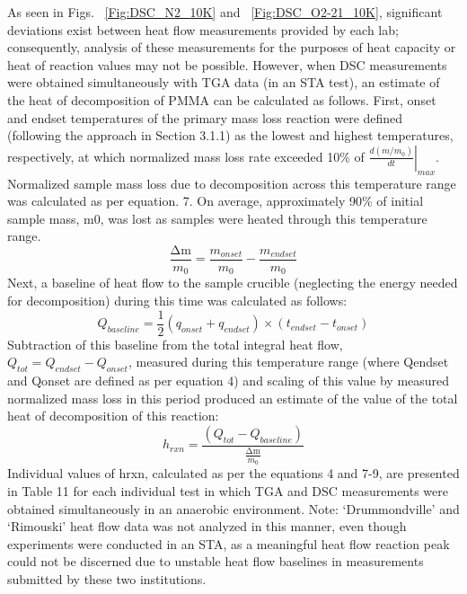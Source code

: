 \documentclass{book}
\begin{document}
As seen in Figs. ~\ref{Fig:DSC_N2_10K} and ~\ref{Fig:DSC_O2-21_10K}, significant deviations exist between heat flow measurements provided by each lab; consequently, analysis of these measurements for the purposes of heat capacity or heat of reaction values may not be possible. However, when DSC measurements were obtained simultaneously with TGA data (in an STA test), an estimate of the heat of decomposition of PMMA can be calculated as follows. First, onset and endset temperatures of the primary mass loss reaction were defined (following the approach in Section 3.1.1) as the lowest and highest temperatures, respectively, at which normalized mass loss rate exceeded 10\% of $\left.\frac{d\left(m/m_0\right)}{dt}\right|_{max}$. Normalized sample mass loss due to decomposition across this temperature range was calculated as per equation. 7. On average, approximately 90\% of initial sample mass, m0, was lost as samples were heated through this temperature range.
\begin{equation}
\frac{\mathrm{\Delta m}}{m_0}=\frac{m_{onset}}{m_0}-\frac{m_{endset}}{m_0}
\end{equation}
Next, a baseline of heat flow to the sample crucible (neglecting the energy needed for decomposition) during this time was calculated as follows:
\begin{equation}
   Q_{baseline}=\frac{1}{2}\left(q_{onset}+q_{endset}\right)\times\left(t_{endset}-t_{onset}\right)
\end{equation}
Subtraction of this baseline from the total integral heat flow, $Q_{tot}=Q_{endset}-Q_{onset}$, measured during this temperature range (where Qendset and Qonset are defined as per equation 4) and scaling of this value by measured normalized mass loss in this period produced an estimate of the value of the total heat of decomposition of this reaction:
\begin{equation}
h_{rxn}=\frac{\left(Q_{tot}-Q_{baseline}\right)}{\frac{\mathrm{\Delta m}}{m_0}}
\end{equation}
Individual values of hrxn, calculated as per the equations 4 and 7-9, are presented in Table 11 for each individual test in which TGA and DSC measurements were obtained simultaneously in an anaerobic environment. Note: ‘Drummondville’ and ‘Rimouski’ heat flow data was not analyzed in this manner, even though experiments were conducted in an STA, as a meaningful heat flow reaction peak could not be discerned due to unstable heat flow baselines in measurements submitted by these two institutions.
\end{document}
